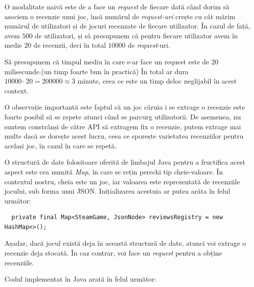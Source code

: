 \documentclass[12pt,a4paper]{report}
\begin{document}
O modalitate naivă este de a face un \emph{request} de fiecare dată când dorim să asociem o recenzie unui joc, însă numărul de \emph{request-uri} crește cu cât mărim numărul de utilizatori și de jocuri recenzate de fiecare utilizator. În cazul de față, avem \(500\) de utilizatori, și să presupunem că pentru fiecare utilizator avem în medie \(20\) de recenzii, deci în total \(10 000 \) de \emph{request}-uri.

Să presupunem că timpul mediu în care s-ar face un request este de \( 20 \) milisecunde.(un timp foarte bun în practică) În total ar dura \( 10 000 \cdot 20 = 200000 \approx 3 \) minute, ceea ce este un timp deloc neglijabil în acest context.

O observație importantă este faptul că un joc căruia i se extrage o recenzie este foarte posibil să se repete atunci când se parcurg utilizatorii. De asemenea, nu suntem constrânși de către API să extragem fix o recenzie, putem extrage mai multe dacă se dorește acest lucru, ceea ce sporește varietatea recenziilor pentru același joc, în cazul în care se repetă.

O structură de date folositoare oferită de limbajul Java pentru a fructifica acest aspect este cea numită \emph{Map}, în care se rețin perechi tip cheie-valoare. În contextul nostru, cheia este un joc, iar valoarea este reprezentată de recenziile jocului, sub forma unui JSON. Inițializarea acestuia ar putea arăta în felul următor:

\begin{verbatim}
  private final Map<SteamGame, JsonNode> reviewsRegistry = new HashMap<>();
\end{verbatim}

Așadar, dacă jocul există deja în această structură de date, atunci voi extrage o recenzie deja stocată. În caz contrar, voi face un \emph{request} pentru a obține recenziile.

Codul implementat în Java arată în felul următor:
\end{document}
